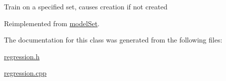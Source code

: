 Train on a specified set, causes creation if not created 

Reimplemented from \hyperlink{classmodel_set_a7620f95e8e29d547e7c688da51b33d9c}{model\+Set}.



The documentation for this class was generated from the following files\+:\begin{DoxyCompactItemize}
\item 
\hyperlink{regression_8h}{regression.\+h}\item 
\hyperlink{regression_8cpp}{regression.\+cpp}\end{DoxyCompactItemize}
